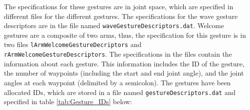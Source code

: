 \documentclass{CSSRforAfrica}
\begin{document}
The specifications for these gestures are in joint space, which are specified in different files for the different gestures. The specifications for the wave gesture descriptors are in the file named \texttt{waveGestureDescriptors.dat}. Welcome gestures are a composite of two arms, thus, the specification for this gesture is in two files \texttt{lArmWelcomeGestureDecriptors} and \\ \texttt{rArmWelcomeGestureDescriptors}.  The specifications in the files contain the information about each gesture. This information includes the ID of the gesture, the number of waypoints (including the start and end joint angle), and the joint angles at each waypoint (delimited by a semicolon). The gestures have been allocated IDs, which are stored in a file named \texttt{gestureDescriptors.dat} and specified in table \ref{tab:Gesture_IDs} below:
\end{document}
